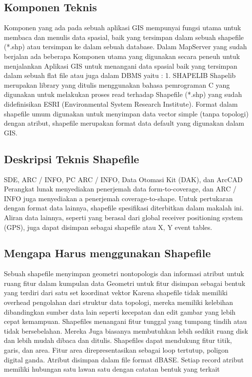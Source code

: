\subsection{Komponen Teknis}
Komponen yang ada pada sebuah aplikasi GIS
mempunyai fungsi utama untuk membaca dan menulis
data spasial, baik yang tersimpan dalam sebuah
shapefile (*.shp) atau tersimpan ke dalam sebuah
database.
Dalam MapServer yang sudah berjalan ada beberapa
Komponen utama yang digunakan secara peneuh untuk
menjalankan Aplikasi GIS untuk menangani data
spasial baik yang tersimpan dalam sebuah flat file atau
juga dalam DBMS yaitu :
1. SHAPELIB
Shapelib merupakan library yang ditulis
menggunakan bahasa pemrograman C yang
digunakan untuk melakukan proses read terhadap
Shapefile (*.shp) yang sudah didefinisikan ESRI
(Environmental System Research Institute).
Format dalam shapefile umum digunakan untuk
menyimpan data vector simple (tanpa topologi)
dengan atribut, shapefile merupakan format data
default yang digunakan dalam GIS.

\subsection{Deskripsi Teknis Shapefile}
SDE, ARC / INFO, PC ARC / INFO, Data Otomasi Kit (DAK), dan ArcCAD
Perangkat lunak menyediakan penerjemah data form-to-coverage, dan ARC / INFO juga menyediakan a 
penerjemah coverage-to-shape. Untuk pertukaran dengan format data lainnya, shapefile 
spesifikasi diterbitkan dalam makalah ini. Aliran data lainnya, seperti yang berasal dari global 
receiver positioning system (GPS), juga dapat disimpan sebagai shapefile atau X, Y event tables. 

\subsection{Mengapa Harus menggunakan Shapefile}
Sebuah shapefile menyimpan geometri nontopologis dan informasi atribut untuk ruang 
fitur dalam kumpulan data Geometri untuk fitur disimpan sebagai bentuk yang terdiri dari satu set 
koordinat vektor 
Karena shapefile tidak memiliki overhead pengolahan dari struktur data topologi, 
mereka memiliki kelebihan dibandingkan sumber data lain seperti kecepatan dan edit gambar yang lebih cepat 
kemampuan. Shapefiles menangani fitur tunggal yang tumpang tindih atau tidak bersebelahan. Mereka 
Juga biasanya membutuhkan lebih sedikit ruang disk dan lebih mudah dibaca dan ditulis. 
Shapefiles dapat mendukung fitur titik, garis, dan area. Fitur area direpresentasikan sebagai 
loop tertutup, poligon digital ganda. Atribut disimpan dalam file format dBASE. 
Setiap record atribut memiliki hubungan satu lawan satu dengan catatan bentuk yang terkait

